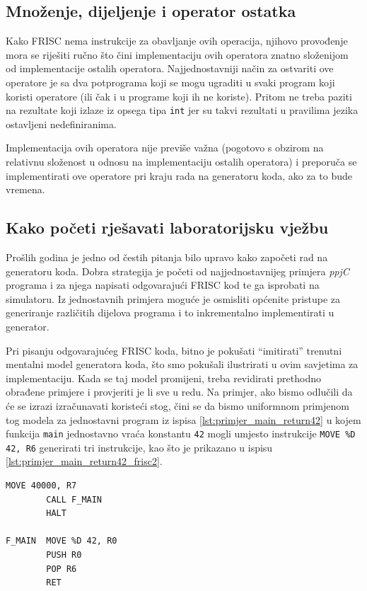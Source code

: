 \documentclass[times, 12pt, utf8]{book}
\begin{document}
\subsection{Množenje, dijeljenje i operator ostatka}
Kako FRISC nema instrukcije za obavljanje ovih operacija, njihovo provođenje mora se riješiti ručno što čini implementaciju ovih operatora znatno složenijom od implementacije ostalih operatora.
Najjednostavniji način za ostvariti ove operatore je sa dva potprograma koji se mogu ugraditi u svaki program koji koristi operatore (ili čak i u programe koji ih ne koriste).
Pritom ne treba paziti na rezultate koji izlaze iz opsega tipa \verb|int| jer su takvi rezultati u pravilima jezika ostavljeni nedefiniranima.

Implementacija ovih operatora nije previše važna (pogotovo s obzirom na relativnu složenost u odnosu na implementaciju ostalih operatora) i preporuča se implementirati ove operatore pri kraju rada na generatoru koda, ako za to bude vremena.

\subsection{Kako početi rješavati laboratorijsku vježbu}
Prošlih godina je jedno od čestih pitanja bilo upravo kako započeti rad na generatoru koda.
Dobra strategija je početi od najjednostavnijeg primjera \emph{ppjC} programa i za njega napisati odgovarajući FRISC kod te ga isprobati na simulatoru.
Iz jednostavnih primjera moguće je osmisliti općenite pristupe za generiranje različitih dijelova programa i to inkrementalno implementirati u generator.

Pri pisanju odgovarajućeg FRISC koda, bitno je pokušati ``imitirati'' trenutni mentalni model generatora koda, što smo pokušali ilustrirati u ovim savjetima za implementaciju.
Kada se taj model promijeni, treba revidirati prethodno obrađene primjere i provjeriti je li sve u redu.
Na primjer, ako bismo odlučili da će se izrazi izračunavati koristeći stog, čini se da bismo uniformnom primjenom tog modela za jednostavni program iz ispisa \ref{lst:primjer_main_return42} u kojem funkcija \verb|main| jednostavno vraća konstantu \verb|42| mogli umjesto instrukcije \verb|MOVE %D 42, R6| generirati tri instrukcije, kao što je prikazano u ispisu \ref{lst:primjer_main_return42_frisc2}.

\begin{lstlisting}[caption={FRISC mnemonički program za ispis \ref{lst:primjer_main_return42} uz konzistentno računanje izraza pomoću stoga.},label=lst:primjer_main_return42_frisc2]
        MOVE 40000, R7
        CALL F_MAIN
        HALT
        
F_MAIN  MOVE %D 42, R0
        PUSH R0
        POP R6
        RET
\end{lstlisting}
\end{document}
